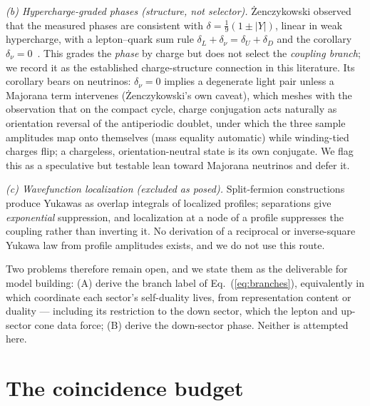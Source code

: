 \documentclass[11pt]{article}
\begin{document}
\emph{(b) Hypercharge-graded phases (structure, not selector).}
\.{Z}enczykowski observed that the measured phases are consistent with
$\delta = \tfrac{1}{9}(1\pm|Y|)$, linear in weak hypercharge, with a lepton--quark
sum rule $\delta_L+\delta_\nu = \delta_U+\delta_D$ and the corollary
$\delta_\nu = 0$~\cite{Zen2012}. This grades the \emph{phase} by charge but does
not select the \emph{coupling branch}; we record it as the established
charge-structure connection in this literature. Its corollary bears on neutrinos:
$\delta_\nu = 0$ implies a degenerate light pair unless a Majorana term intervenes (\.{Z}enczykowski's own caveat), which meshes with the observation that on
the compact cycle, charge conjugation acts naturally as orientation reversal of
the antiperiodic doublet, under which the three sample amplitudes map onto
themselves (mass equality automatic) while winding-tied charges flip; a
chargeless, orientation-neutral state is its own conjugate. We flag this as a
speculative but testable lean toward Majorana neutrinos and defer it.

\emph{(c) Wavefunction localization (excluded as posed).} Split-fermion
constructions~\cite{ArkaniSchmaltz,MirabelliSchmaltz} produce Yukawas as overlap
integrals of localized profiles; separations give \emph{exponential} suppression,
and localization at a node of a profile suppresses the coupling rather than
inverting it. No derivation of a reciprocal or inverse-square Yukawa law from
profile amplitudes exists, and we do not use this route.

Two problems therefore remain open, and we state them as the deliverable for model
building: (A) derive the branch label of Eq.~(\ref{eq:branches}), equivalently in which coordinate each sector's self-duality lives, from
representation content or duality --- including its restriction to the down
sector, which the lepton and up-sector cone data force; (B) derive the down-sector phase. Neither is
attempted here.

\section{The coincidence budget}
\label{sec:budget}
\end{document}
